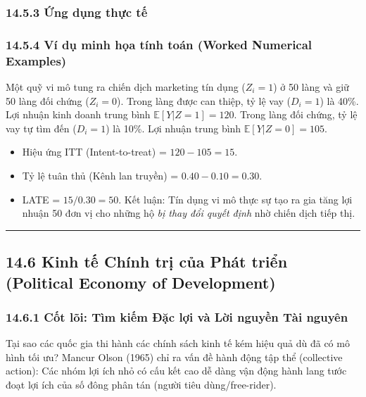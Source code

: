 \documentclass[
]{article}
\providecommand{\tightlist}{%
  \setlength{\itemsep}{0pt}\setlength{\parskip}{0pt}}
\begin{document}
\subsubsection{14.5.3 Ứng dụng thực
tế}\label{ux1ee9ng-dux1ee5ng-thux1ef1c-tux1ebf-4}

\subsubsection{14.5.4 Ví dụ minh họa tính toán (Worked Numerical
Examples)}\label{vuxed-dux1ee5-minh-hux1ecda-tuxednh-touxe1n-worked-numerical-examples-42}

Một quỹ vi mô tung ra chiến dịch marketing tín dụng (\(Z_i = 1\)) ở 50
làng và giữ 50 làng đối chứng (\(Z_i = 0\)). Trong làng được can thiệp,
tỷ lệ vay (\(D_i=1\)) là 40\%. Lợi nhuận kinh doanh trung bình
\(\mathbb{E}[Y|Z=1] = 120\). Trong làng đối chứng, tỷ lệ vay tự tìm đến
(\(D_i=1\)) là 10\%. Lợi nhuận trung bình \(\mathbb{E}[Y|Z=0] = 105\).

\begin{itemize}
\tightlist
\item
  Hiệu ứng ITT (Intent-to-treat) = \(120 - 105 = 15\).
\item
  Tỷ lệ tuân thủ (Kênh lan truyền) = \(0.40 - 0.10 = 0.30\).
\item
  LATE = \(15 / 0.30 = 50\). Kết luận: Tín dụng vi mô thực sự tạo ra gia
  tăng lợi nhuận 50 đơn vị cho những hộ \emph{bị thay đổi quyết định}
  nhờ chiến dịch tiếp thị.
\end{itemize}

\begin{center}\rule{0.5\linewidth}{0.5pt}\end{center}

\subsection{14.6 Kinh tế Chính trị của Phát triển (Political Economy of
Development)}\label{kinh-tux1ebf-chuxednh-trux1ecb-cux1ee7a-phuxe1t-triux1ec3n-political-economy-of-development}

\subsubsection{14.6.1 Cốt lõi: Tìm kiếm Đặc lợi và Lời nguyền Tài
nguyên}\label{cux1ed1t-luxf5i-tuxecm-kiux1ebfm-ux111ux1eb7c-lux1ee3i-vuxe0-lux1eddi-nguyux1ec1n-tuxe0i-nguyuxean}

Tại sao các quốc gia thi hành các chính sách kinh tế kém hiệu quả dù đã
có mô hình tối ưu? Mancur Olson (1965) chỉ ra vấn đề hành động tập thể
(collective action): Các nhóm lợi ích nhỏ có cấu kết cao dễ dàng vận
động hành lang tước đoạt lợi ích của số đông phân tán (người tiêu
dùng/free-rider).
\end{document}
